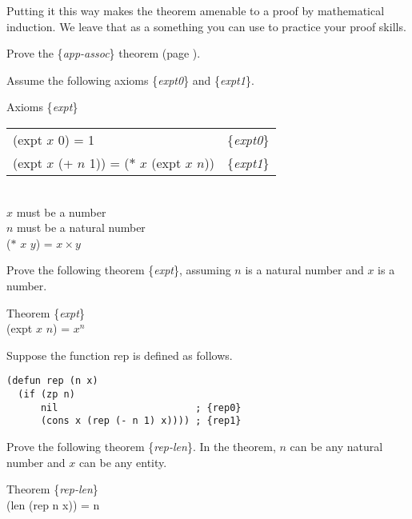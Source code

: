 Putting it this way makes the theorem amenable to a proof by mathematical induction. We leave that as a something you can use to practice your proof skills.


\begin{ExerciseList}
\Exercise Prove the \{\emph{app-assoc}\} theorem (page \pageref{app-assoc}).

\Exercise Assume the following axioms \{\emph{expt0}\} and \{\emph{expt1}\}.
\begin{samepage}
\label{expt-equations}
\begin{center}
Axioms \{\emph{expt}\} \\
\begin{tabular}{ll}
(expt $x$ 0) = 1                                & \{\emph{expt0}\} \\
(expt $x$ (+ $n$ 1)) = ($*$ $x$ (expt $x$ $n$)) & \{\emph{expt1}\} \\
\hline
\end{tabular}
\\ $x$ must be a number
\\ $n$ must be a natural number
\\ ($*$ $x$ $y$) = $x \times y$
\end{center}
\end{samepage}
Prove the following theorem \{\emph{expt}\}, assuming $n$ is a natural number and $x$ is a number.
\begin{samepage}
\label{expt-thm}
\begin{center}
Theorem \{\emph{expt}\} \\
(expt $x$ $n$) = $x^n$
\end{center}
\end{samepage}

\Exercise Suppose the function rep is defined as follows.
\label{rep-equations}
\begin{Verbatim}
(defun rep (n x)
  (if (zp n)
      nil                        ; {rep0}
      (cons x (rep (- n 1) x)))) ; {rep1}
\end{Verbatim}
Prove the following theorem \{\emph{rep-len}\}.
In the theorem, $n$ can be any natural number and $x$ can be any entity.
\begin{samepage}
\label{rep-len}
\begin{center}
Theorem \{\emph{rep-len}\} \\
(len (rep n x)) = n
\end{center}
\end{samepage}


\end{ExerciseList}
